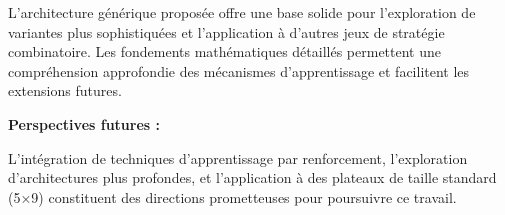 \documentclass[12pt,a4paper]{report}
\numberwithin{equation}{section}
\begin{document}
L'architecture générique proposée offre une base solide pour l'exploration de variantes plus sophistiquées et l'application à d'autres jeux de stratégie combinatoire. Les fondements mathématiques détaillés permettent une compréhension approfondie des mécanismes d'apprentissage et facilitent les extensions futures.

\textbf{Perspectives futures :}

L'intégration de techniques d'apprentissage par renforcement, l'exploration d'architectures plus profondes, et l'application à des plateaux de taille standard (5×9) constituent des directions prometteuses pour poursuivre ce travail.



\end{document}
